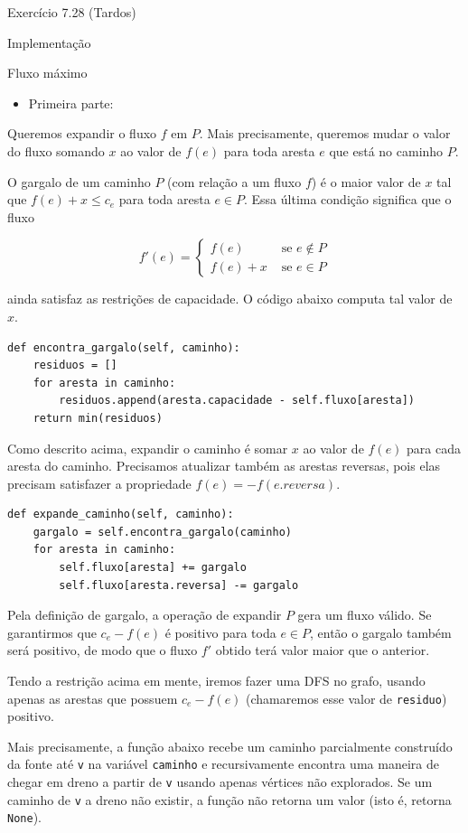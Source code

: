 \documentclass[presentation]{beamer}
\begin{document}
\begin{frame}[fragile,label=sec-2]{Exercício 7.28 (Tardos)}
\begin{block}{Implementação}
\begin{block}{Fluxo máximo}
\begin{itemize}
\item Primeira parte:
\end{itemize}

Queremos expandir o fluxo $f$ em $P$. Mais precisamente, queremos
mudar o valor do fluxo somando $x$ ao valor de $f(e)$ para toda aresta
$e$ que está no caminho $P$.

O gargalo de um caminho $P$ (com relação a um fluxo $f$) é o maior
valor de $x$ tal que $f(e) + x \leq c_e$ para toda aresta $e \in
P$. Essa última condição significa que o fluxo

\[ f'(e) = \begin{cases}f(e)&\text{ se } e \not\in P \\
                        f(e) + x&\text{ se } e \in P\end{cases} \]

ainda satisfaz as restrições de capacidade. O código abaixo computa
tal valor de $x$.
\begin{verbatim}
def encontra_gargalo(self, caminho):
    residuos = []
    for aresta in caminho:
        residuos.append(aresta.capacidade - self.fluxo[aresta])
    return min(residuos)
\end{verbatim}

Como descrito acima, expandir o caminho é somar $x$ ao valor de $f(e)$
para cada aresta do caminho. Precisamos atualizar também as arestas
reversas, pois elas precisam satisfazer a propriedade $f(e) =
-f(e.reversa)$.
\begin{verbatim}
def expande_caminho(self, caminho):
    gargalo = self.encontra_gargalo(caminho)
    for aresta in caminho:
        self.fluxo[aresta] += gargalo
        self.fluxo[aresta.reversa] -= gargalo
\end{verbatim}

Pela definição de gargalo, a operação de expandir $P$ gera um fluxo
válido. Se garantirmos que $c_e - f(e)$ é positivo para toda $e \in
P$, então o gargalo também será positivo, de modo que o fluxo $f'$
obtido terá valor maior que o anterior.

Tendo a restrição acima em mente, iremos fazer uma DFS no grafo,
usando apenas as arestas que possuem $c_e - f(e)$ (chamaremos esse
valor de \verb~residuo~) positivo.

Mais precisamente, a função abaixo recebe um caminho parcialmente
construído da fonte até \verb~v~ na variável \verb~caminho~ e recursivamente
encontra uma maneira de chegar em dreno a partir de \verb~v~ usando apenas
vértices não explorados. Se um caminho de \verb~v~ a dreno não existir, a
função não retorna um valor (isto é, retorna \verb~None~).


\end{block}
\end{block}
\end{frame}
\end{document}
